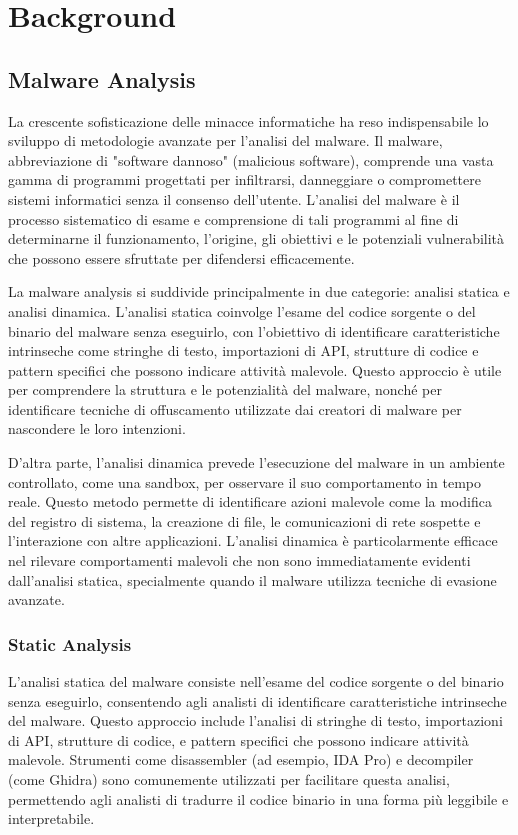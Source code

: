 \chapter{Background}
\label{cap:background}

\section{Malware Analysis}

La crescente sofisticazione delle minacce informatiche ha reso indispensabile lo sviluppo di metodologie avanzate per l'analisi del malware. Il malware, abbreviazione di "software dannoso" (malicious software), comprende una vasta gamma di programmi progettati per infiltrarsi, danneggiare o compromettere sistemi informatici senza il consenso dell'utente. L'analisi del malware è il processo sistematico di esame e comprensione di tali programmi al fine di determinarne il funzionamento, l'origine, gli obiettivi e le potenziali vulnerabilità che possono essere sfruttate per difendersi efficacemente.

La malware analysis si suddivide principalmente in due categorie: analisi statica e analisi dinamica. L'analisi statica coinvolge l'esame del codice sorgente o del binario del malware senza eseguirlo, con l'obiettivo di identificare caratteristiche intrinseche come stringhe di testo, importazioni di API, strutture di codice e pattern specifici che possono indicare attività malevole. Questo approccio è utile per comprendere la struttura e le potenzialità del malware, nonché per identificare tecniche di offuscamento utilizzate dai creatori di malware per nascondere le loro intenzioni.

D'altra parte, l'analisi dinamica prevede l'esecuzione del malware in un ambiente controllato, come una sandbox, per osservare il suo comportamento in tempo reale. Questo metodo permette di identificare azioni malevole come la modifica del registro di sistema, la creazione di file, le comunicazioni di rete sospette e l'interazione con altre applicazioni. L'analisi dinamica è particolarmente efficace nel rilevare comportamenti malevoli che non sono immediatamente evidenti dall'analisi statica, specialmente quando il malware utilizza tecniche di evasione avanzate.

\subsection{Static Analysis}

L'analisi statica del malware consiste nell'esame del codice sorgente o del binario senza eseguirlo, consentendo agli analisti di identificare caratteristiche intrinseche del malware. Questo approccio include l'analisi di stringhe di testo, importazioni di API, strutture di codice, e pattern specifici che possono indicare attività malevole. Strumenti come disassembler (ad esempio, IDA Pro) e decompiler (come Ghidra) sono comunemente utilizzati per facilitare questa analisi, permettendo agli analisti di tradurre il codice binario in una forma più leggibile e interpretabile.

